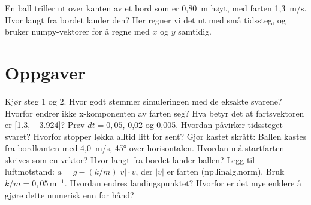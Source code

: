 \documentclass[11pt]{article}
\begin{document}

En ball triller ut over kanten av et bord som er 0,80~m høyt, med farten 1,3~m/s. Hvor langt fra bordet lander den? Her regner vi det ut med små tidssteg, og bruker numpy-vektorer for å regne med $x$ og $y$ samtidig.

\section*{Oppgaver}

\begin{oppgaveliste}
\oppgave {}Kjør steg 1 og 2. Hvor godt stemmer simuleringen med de eksakte svarene?
\svar
\oppgave {}Hvorfor endrer ikke x-komponenten av farten seg? Hva betyr det at fartsvektoren er [1.3, −3.924]?
\svar
\oppgave {}Prøv $dt = 0{,}05$, 0,02 og 0,005. Hvordan påvirker tidssteget svaret? Hvorfor stopper løkka alltid litt for sent?
\svar
\oppgave {}Gjør kastet skrått: Ballen kastes fra bordkanten med 4,0~m/s, 45° over horisontalen. Hvordan må startfarten skrives som en vektor? Hvor langt fra bordet lander ballen?
\svar
\oppgave {}Legg til luftmotstand: $a = g - (k/m)|v| \cdot v$, der $|v|$ er farten (np.linalg.norm). Bruk $k/m = 0{,}05\,\mathrm{m^{-1}}$. Hvordan endres landingspunktet? Hvorfor er det mye enklere å gjøre dette numerisk enn for hånd?
\svar
\end{oppgaveliste}
\end{document}
